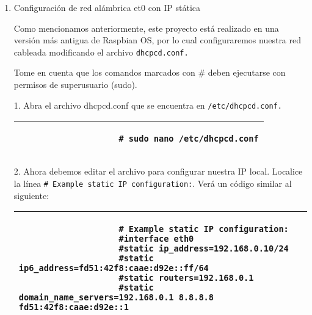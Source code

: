 \documentclass[report,12pt]{article}
\begin{document}
	\begin{enumerate}[label=\alph*.]
		\item Configuración de red alámbrica et0 con IP stática\par
		
	Como mencionamos anteriormente, este proyecto está realizado en una versión más antigua de Raspbian OS, por lo cual configuraremos nuestra red cableada modificando el archivo \texttt{dhcpcd.conf.}
	
	Tome en cuenta que los comandos marcados con \# deben ejecutarse con permisos de superusuario (sudo).
	
	1. Abra el archivo dhcpcd.conf que se encuentra en \texttt{/etc/dhcpcd.conf.}
	
	\vspace{-1cm}
		\begin{table}[h]
			\centering
			\small %
			\color{gray} %
			\begin{tabular}{|p{\linewidth}|}
				\hline
				\begin{verbatim}
					# sudo nano /etc/dhcpcd.conf
				\end{verbatim}
				\\
				\hline
			\end{tabular}
		\end{table}
		
	\vspace{-1cm}
		2. Ahora debemos editar el archivo para configurar nuestra IP local. Localice la línea \texttt{\# Example static IP configuration:}. Verá un código similar al siguiente:
		
	\vspace{-1cm}
			\begin{table}[h]
			\centering
			\small %
			\color{gray} %
			\begin{tabular}{|p{\linewidth}|}
				\hline
				\begin{verbatim}
					# Example static IP configuration:
					#interface eth0
					#static ip_address=192.168.0.10/24
					#static ip6_address=fd51:42f8:caae:d92e::ff/64
					#static routers=192.168.0.1
					#static domain_name_servers=192.168.0.1 8.8.8.8 fd51:42f8:caae:d92e::1
				\end{verbatim}
				\\
				\hline
			\end{tabular}
		\end{table} 
		

\end{enumerate}
\end{document}

